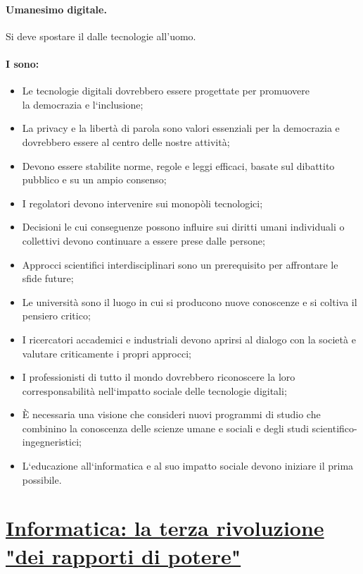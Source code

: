 \paragraph{Umanesimo digitale.} Si deve spostare il  dalle tecnologie all'uomo.

\paragraph{I  sono:}

\begin{itemize}
    \item Le tecnologie digitali dovrebbero essere progettate per promuovere \\la democrazia
e l‘inclusione;
\item La privacy e la libertà di parola sono valori essenziali per la democrazia e dovrebbero
essere al centro delle nostre attività;
\item Devono essere stabilite norme, regole e leggi efficaci, basate sul dibattito pubblico
e su un ampio consenso;
\item I regolatori devono intervenire sui monopòli tecnologici;
\item Decisioni le cui conseguenze possono influire sui diritti umani individuali o collettivi
devono continuare a essere prese dalle persone;
\item Approcci scientifici interdisciplinari sono un prerequisito per affrontare le sfide
future;
\item Le università sono il luogo in cui si producono nuove conoscenze e si coltiva
il pensiero critico;
\item I ricercatori accademici e industriali devono aprirsi al dialogo con la società e valutare
criticamente i propri approcci;
\item I professionisti di tutto il mondo dovrebbero riconoscere la loro corresponsabilità
nell‘impatto sociale delle tecnologie digitali;
\item È necessaria una visione che consideri nuovi programmi di studio che combinino
la conoscenza delle scienze umane e sociali e degli studi scientifico-ingegneristici;
\item L‘educazione all‘informatica e al suo impatto sociale devono iniziare il prima
possibile.
\end{itemize}

\section{\href{https://link-and-think.blogspot.com/2019/02/informatica-la-terza-rivoluzione-dei-rapporti-di-potere.html}{Informatica: la terza rivoluzione "dei rapporti di potere"}}

